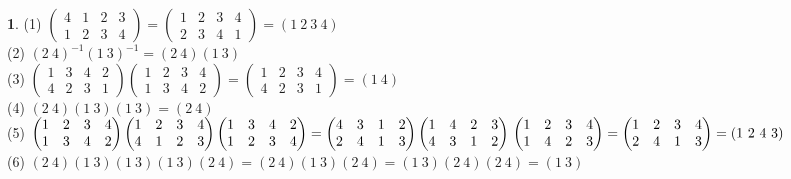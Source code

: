 \documentclass{amsart}
\theoremstyle{definition}
\newtheorem{ans}{}
\numberwithin{ans}{subsection}
\begin{document}
\begin{ans}
  (1) $\begin{pmatrix}
    4 & 1 & 2 & 3 \\
    1 & 2 & 3 & 4
  \end{pmatrix} =
  \begin{pmatrix}
    1 & 2 & 3 & 4 \\
    2 & 3 & 4 & 1
  \end{pmatrix} = (1\ 2\ 3\ 4)$ \\
  (2) $(2\ 4)^{-1}(1\ 3)^{-1} = (2\ 4)(1\ 3)$ \\
  (3) $\begin{pmatrix}
    1 & 3 & 4 & 2 \\
    4 & 2 & 3 & 1
  \end{pmatrix}\begin{pmatrix}
    1 & 2 & 3 & 4 \\
    1 & 3 & 4 & 2
  \end{pmatrix} = \begin{pmatrix}
    1 & 2 & 3 & 4 \\
    4 & 2 & 3 & 1
  \end{pmatrix} = (1\ 4)$ \\
  (4) $(2\ 4)(1\ 3)(1\ 3) = (2\ 4)$ \\
  (5) $\begin{pmatrix}
    1 & 2 & 3 & 4 \\
    1 & 3 & 4 & 2
  \end{pmatrix}\begin{pmatrix}
    1 & 2 & 3 & 4 \\
    4 & 1 & 2 & 3
  \end{pmatrix}\begin{pmatrix}
    1 & 3 & 4 & 2 \\
    1 & 2 & 3 & 4
  \end{pmatrix} = \begin{pmatrix}
    4 & 3 & 1 & 2 \\
    2 & 4 & 1 & 3
  \end{pmatrix}\begin{pmatrix}
    1 & 4 & 2 & 3 \\
    4 & 3 & 1 & 2
  \end{pmatrix}\\
  \begin{pmatrix}
    1 & 2 & 3 & 4 \\
    1 & 4 & 2 & 3
  \end{pmatrix} = \begin{pmatrix}
    1 & 2 & 3 & 4 \\
    2 & 4 & 1 & 3
  \end{pmatrix} = (1\ 2\ 4\ 3)$\\
  (6) $(2\ 4)(1\ 3)(1\ 3)(1\ 3)(2\ 4) = (2\ 4)(1\ 3)(2\ 4) = (1\ 3)(2\ 4)(2\ 4) = (1\ 3)$
\end{ans}
\end{document}
